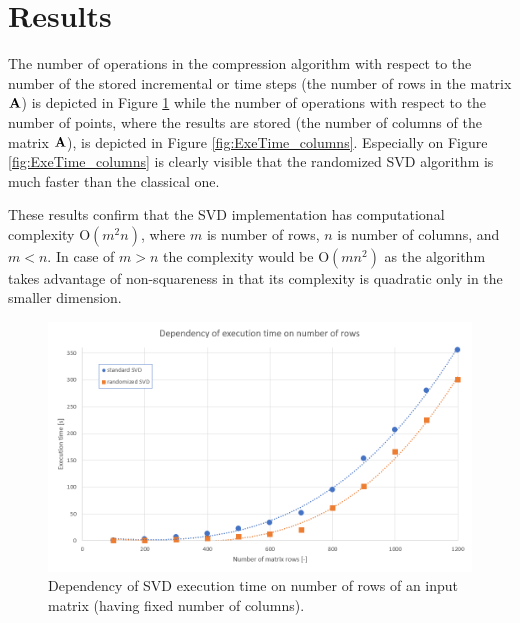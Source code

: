 \section{Results}
\label{sec:results}

The number of operations in the compression algorithm with respect to the number of the stored incremental or time steps (the number of rows in the matrix $\mathbf{A}$) is depicted in Figure \ref{fig:ExeTime_rows} while the number of operations with respect to the number of points, where the results are stored (the number of columns of the matrix $\mathbf{A}$), is depicted in Figure \ref{fig:ExeTime_columns}. Especially on Figure \ref{fig:ExeTime_columns} is clearly visible that the randomized SVD algorithm is much faster than the classical one.

These results confirm that the SVD implementation has computational complexity $\mathrm{O}(m^2n)$, where $m$ is number of rows, $n$ is number of columns, and $m < n$. In case of $m > n$ the complexity would be $\mathrm{O}(mn^2)$ as the algorithm takes advantage of non-squareness in that its complexity is quadratic only in the smaller dimension.

\begin{figure}[H]
\centering\includegraphics[width=\textwidth]{figures/executionTime_varyingRows}
\caption{Dependency of SVD execution time on number of rows of an input matrix (having fixed number of columns).}
\label{fig:ExeTime_rows}
\end{figure}

